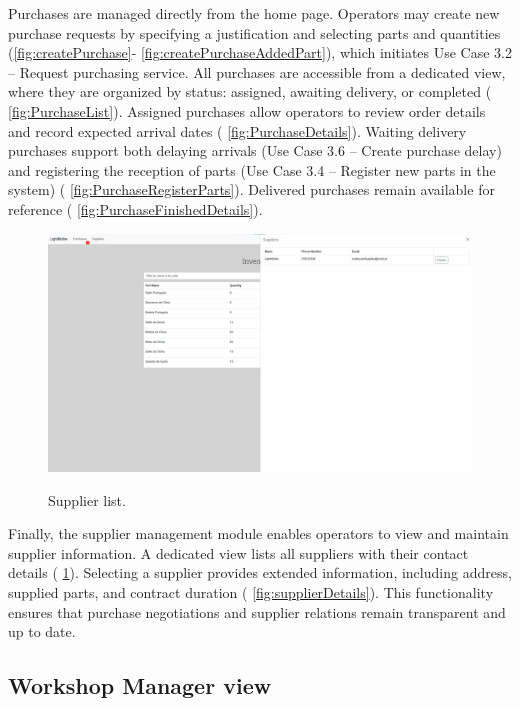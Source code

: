 Purchases are managed directly from the home page. Operators may create new purchase requests by specifying a justification and selecting parts and quantities (\ref{fig:createPurchase}- \ref{fig:createPurchaseAddedPart}), which initiates Use Case 3.2 – Request purchasing service. All purchases are accessible from a dedicated view, where they are organized by status: assigned, awaiting delivery, or completed ( \ref{fig:PurchaseList}). Assigned purchases allow operators to review order details and record expected arrival dates ( \ref{fig:PurchaseDetails}). Waiting delivery purchases support both delaying arrivals (Use Case 3.6 – Create purchase delay) and registering the reception of parts (Use Case 3.4 – Register new parts in the system) ( \ref{fig:PurchaseRegisterParts}). Delivered purchases remain available for reference ( \ref{fig:PurchaseFinishedDetails}).


\begin{figure}[h]
  \caption{Supplier list.}
  \centering
  \includegraphics[width=\textwidth]{figs/Implementation/warehouse/supplierList}
  \label{fig:supplierList}
\end{figure}



Finally, the supplier management module enables operators to view and maintain supplier information. A dedicated view lists all suppliers with their contact details ( \ref{fig:supplierList}). Selecting a supplier provides extended information, including address, supplied parts, and contract duration ( \ref{fig:supplierDetails}). This functionality ensures that purchase negotiations and supplier relations remain transparent and up to date.

\subsection{Workshop Manager view}


